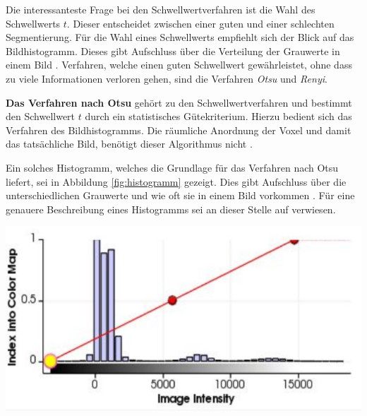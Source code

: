 Die interessanteste Frage bei den Schwellwertverfahren ist die Wahl des
Schwellwerts $t$. Dieser entscheidet zwischen einer guten und einer schlechten Segmentierung.
Für die Wahl eines Schwellwerts empfiehlt sich der Blick auf das Bildhistogramm.
Dieses gibt Aufschluss über die Verteilung der Grauwerte in einem Bild \citep[vgl.][S.~361]{lehmann2013bildverarbeitung}.
Verfahren, welche einen guten Schwellwert gewährleistet, ohne dass zu viele Informationen
verloren gehen, sind die Verfahren \textit{Otsu} und \textit{Renyi}.

\pagebreak

\textbf{Das Verfahren nach Otsu} gehört zu den Schwellwertverfahren und bestimmt
den Schwellwert $t$ durch ein statistisches Gütekriterium. Hierzu bedient sich das
Verfahren des Bildhistogramms. Die räumliche Anordnung der Voxel und damit das
tatsächliche Bild, benötigt dieser Algorithmus nicht \citep[vgl.][S.~264]{lehmann2013bildverarbeitung}.

\begin{minipage}{0.40\textwidth}
	Ein solches Histogramm, welches die Grundlage für das Verfahren nach Otsu
	liefert, sei in Abbildung \ref{fig:histogramm} gezeigt. Dies gibt Aufschluss
	über die unterschiedlichen Grauwerte und wie oft sie in einem Bild vorkommen
	\citep[vgl.][S.~264]{lehmann2013bildverarbeitung}. Für eine genauere
	Beschreibung eines Histogramms sei an dieser Stelle auf \citet[S.~42]{burger2009}
	verwiesen.
\end{minipage}
\hfill
\begin{minipage}{0.50\textwidth}
	\centering
	\includegraphics[width=1\textwidth]{img/histogramm.jpg}
	\label{fig:histogramm}
\end{minipage}

